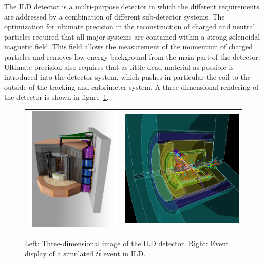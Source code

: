 \documentclass[%
 amsmath,amssymb,
 aps,
]{revtex4-1}
\begin{document}
The ILD detector is a multi-purpose detector in which the different requirements are addressed by a combination of different sub-detector systems. The optimization for ultimate precision in the reconstruction of charged and neutral particles required that all major systems are contained within a strong solenoidal magnetic field. This field allows the measurement of the momentum of charged particles and removes low-energy background from the main part of the detector. Ultimate precision also requires that as little dead material as possible is introduced into the detector system, which pushes in particular the coil to the outside of the tracking and calorimeter system. A three-dimensional rendering of the detector is shown in figure~\ref{fig:ILD}.
\begin{figure}[tb]
 \begin{center}
 \begin{tabular}{lr}
 \includegraphics[width=0.48\hsize,clip]{figures/ILD.pdf} & 
 \includegraphics[width=0.35\hsize]{figures/tt_500GeV_3D.png}
 \\
 \end{tabular}
\caption{Left: Three-dimensional image of the ILD detector. Right: Event display of a simulated $t \bar t$ event in ILD.
\label{fig:ILD}}
 \end{center}
 \end{figure}
\end{document}
